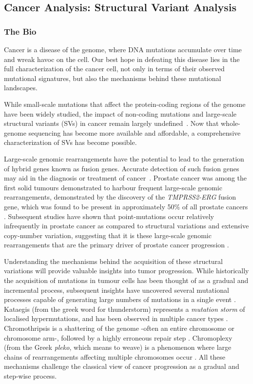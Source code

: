 \subsection{Cancer Analysis: Structural Variant Analysis}
\subsubsection{The Bio}

Cancer is a disease of the genome, where DNA mutations accumulate over time and wreak havoc on the cell. Our best hope in defeating this disease lies in the full characterization of the cancer cell, not only in terms of their observed mutational signatures, but also the mechanisms behind these mutational landscapes.

While small-scale mutations that affect the protein-coding regions of the genome have been widely studied, the impact of non-coding mutations and large-scale structural variants (SVs) in cancer remain largely undefined~\cite{cuykendall2017non,khurana2016role}. Now that whole-genome sequencing has become more available and affordable, a comprehensive characterization of SVs has become possible.

Large-scale genomic rearrangements have the potential to lead to the generation of hybrid genes known as fusion genes.
Accurate detection of such fusion genes may aid in the diagnosis or treatment of cancer~\cite{nowell1960chromosome,nowell1961chromosome,druker2001activity,druker2001efficacy}.
Prostate cancer was among the first solid tumours demonstrated to harbour frequent large-scale genomic rearrangements, demonstrated by the discovery of the \emph{TMPRSS2-ERG} fusion gene, which was found to be present in approximately 50\% of all prostate cancers \cite{tomlins2005recurrent}.
Subsequent studies have shown that point-mutations occur relatively infrequently in prostate cancer as compared to structural variations and extensive copy-number variation, suggesting that it is these large-scale genomic rearrangements that are the primary driver of prostate cancer progression \cite{taylor2010integrative,rubin2011common}.

Understanding the mechanisms behind the acquisition of these structural variations will provide valuable insights into tumor progression.
While historically the acquisition of mutations in tumour cells has been thought of as a gradual and incremental process, subsequent insights have uncovered several mutational processes capable of generating large numbers of mutations in a single event \cite{cortes2020comprehensive,willis2015}.
Kataegis (from the greek word for thunderstorm) represents a \emph{mutation storm} of localised hypermutations, and has been observed in multiple cancer types \cite{nik2012mutational,davis2014somatic}.
Chromothripsis is a shattering of the genome -often an entire chromosome or chromosome arm-, followed by a highly erroneous repair step \cite{stephens2011massive,maher2012chromothripsis}.
Chromoplexy (from the Greek \emph{pleko}, which means to weave) is a phenomenon where large chains of rearrangements affecting multiple chromosomes occur \cite{shen2013chromoplexy}. All these mechanisms challenge the classical view of cancer progression as a gradual and step-wise process.

